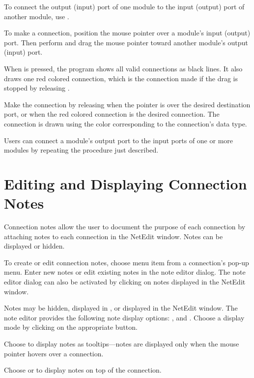 To connect the output (input) port of one module to the input (output)
port of another module, use .

To make a connection, position the mouse pointer over a module's input
(output) port.  Then perform  and drag the
mouse pointer toward another module's output (input) port.

When  is pressed, the program shows all valid connections as black
lines.  It also draws one red colored connection, which is the
connection made if the drag is stopped by releasing .

Make the connection by releasing  when the pointer is over the
desired destination port, or when the red colored connection is the
desired connection.  The connection is drawn using the color
corresponding to the connection's data type.

Users can connect a module's output port to the input ports of one or more
modules by repeating the procedure just described.

\section{Editing and Displaying Connection Notes}
\label{sec:displaynotes}

Connection notes allow the user to document the purpose of
each connection by attaching notes to each connection in the NetEdit window.
Notes can be displayed or hidden.

To create or edit connection notes, choose menu item
 from a connection's pop-up menu. Enter new notes
or edit existing notes in the note editor dialog.  The note editor
dialog can also be activated by clicking  on notes
displayed in the NetEdit window.

Notes may be hidden, displayed in , or displayed in the
NetEdit window.  The note editor provides the following note display
options: ,  and .
Choose a display mode by clicking  on the
appropriate button.

Choose  to display notes as tooltips---notes are
displayed only when the mouse pointer hovers over a connection.

Choose  or  to display notes on top
of the connection.

